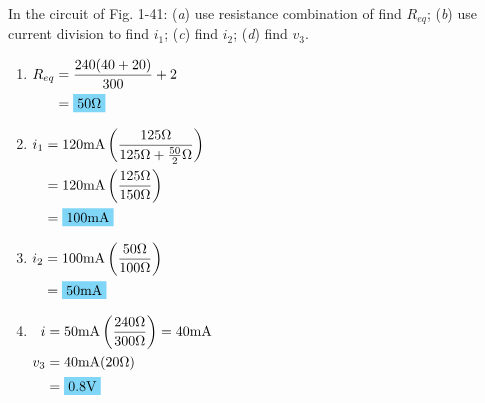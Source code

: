 In the circuit of Fig. 1-41: (\emph{a}) use resistance combination of find $R_{eq}$; (\emph{b}) use current division to find $i_1$; (\emph{c}) find $i_2$; (\emph{d}) find $v_3$.
\begin{enumerate}[leftmargin=2cm,labelsep=.5cm,label=\bfseries\alph*)]
	\item $
	\begin{aligned}[t]
	R_{eq} &= \frac{240(40+20)}{300}+2 \\
	&= \hlbox{50\qw{\ohm}}
	\end{aligned} $
	\\[1cm]
	
	\item $
	\begin{aligned}[t]
	i_1 &= 120\qw{\mA}\left(\frac{125\qw{\ohm}}{125\qw{\ohm}+\frac{50}{2}\qw{\ohm}}\right) \\
	&= 120\qw{\mA}\left(\frac{125\qw{\ohm}}{150\qw{\ohm}}\right) \\
	&= \hlbox{100\qw{\mA}}
	\end{aligned} $
	\\[1cm]
	
	\item $
	\begin{aligned}[t]
	i_2 &= 100\qw{\mA}\left(\frac{50\qw{\ohm}}{100\qw{\ohm}}\right) \\
	&= \hlbox{50\qw{\mA}}
	\end{aligned} $
	\\[1cm]
	
	\item $
	\begin{aligned}[t]
	i &= 50\qw{\mA}\left(\frac{240\qw{\ohm}}{300\qw{\ohm}}\right) = 40\qw{\mA} \\
	v_3 &= 40\qw{\mA}(20\qw{\ohm}) \\
	&= \hlbox{0.8\qw{\V}}
	\end{aligned} $
	\\[1cm]
\end{enumerate}
